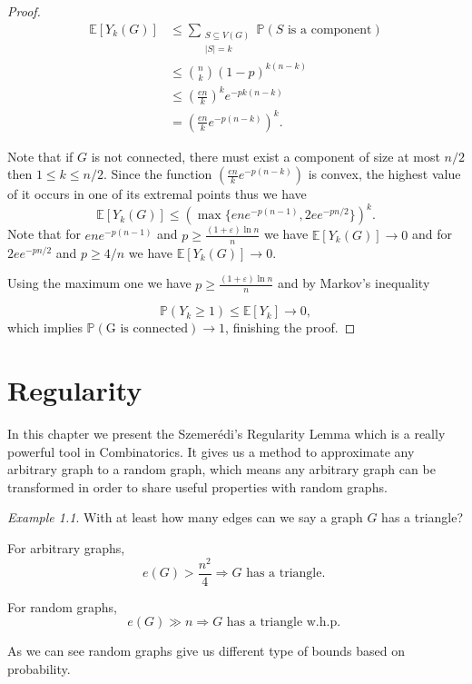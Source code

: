 \documentclass[12pt,twoside,a4paper,bibliography=totocnumbered]{book}
\numberwithin{equation}{section}
\let\log=\ln
\theoremstyle{remark}
\newtheorem{example}	[theorem] {Example}
\begin{document}
\begin{proof}
\begin{align*}
\mathbb{E}[Y_k (G)]  & \leq \sum_{\substack{S\subseteq V(G) \\ |S| = k}} \mathbb{P}(S\text{ is a component})\\
&\leq \binom{n}{k}(1-p)^{k(n-k)}\\
&\leq \left( \frac{en}{k} \right) ^k e^{-pk(n-k)}\\
& = \left( \frac{en}{k} e^{-p(n-k)} \right)^k.
\end{align*}

Note that if $G$ is not connected, there must exist a component of size at most $ n/2$ then $1 \leq k \leq n/2$. Since the function $\left( \frac{en}{k} e^{-p(n-k)} \right)$ is convex, the highest value of it occurs in one of its extremal points thus we have
$$\mathbb{E}[Y_k (G)] \leq (\max\{ene^{-p(n-1)}, 2ee^{-pn/2}\})^k .$$
Note that for $ene^{-p(n-1)}$ and $p \geq \frac{(1 + \varepsilon) \log n}{n}$ we have $\mathbb{E}[Y_k (G)] \rightarrow 0$ and for $2ee^{-pn/2}$ and $p \geq 4/n$ we have $\mathbb{E}[Y_k (G)] \rightarrow 0$.

Using the maximum one we have $p \geq \frac{(1 + \varepsilon) \log n}{n}$  and by Markov's inequality

 $$\mathbb{P}(Y_k \geq 1) \leq \mathbb{E}[Y_k] \rightarrow 0,$$
 which implies $\mathbb{P}(\text{G is connected}) \rightarrow 1$, finishing the proof.

\end{proof}
\chapter{Regularity}
In this chapter we present the Szemerédi's Regularity Lemma which is a really powerful tool in Combinatorics. It gives us a method to approximate any arbitrary graph to a random graph, which means any arbitrary graph can be transformed in order to share useful properties with random graphs.

\begin{example}
With at least how many edges can we say a graph $G$ has a triangle?

For arbitrary graphs,
$$ e(G) > \frac{n^2}{4} \Rightarrow G \text{ has a triangle. }$$

For random graphs,
$$ e(G) \gg n \Rightarrow G\text{ has a triangle w.h.p. } $$

As we can see random graphs give us different type of bounds based on probability.

\end{example}
\end{document}
